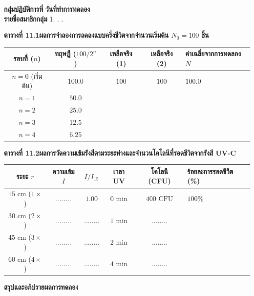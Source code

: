 \begin{worksheetbox}
\textbf{กลุ่มปฏิบัติการที่} \dotfill \textbf{วันที่ทำการทดลอง} \dotfill\\[4pt]
\textbf{รายชื่อสมาชิกกลุ่ม} 1. . . \dotfill

\vspace{4pt}
\textbf{ตารางที่ 11.1\quad ผลการจำลองการลดลงแบบครึ่งชีวิตจากจำนวนเริ่มต้น $N_0 = 100$ ชิ้น}
\begin{center}
\footnotesize\setlength{\tabcolsep}{3.5pt}
\begin{tabularx}{\linewidth}{c c c c >{\raggedright\arraybackslash}X}
\toprule
\textbf{รอบที่ ($n$)} & \textbf{ทฤษฎี ($100/2^n$)} & \textbf{เหลือจริง (1)} & \textbf{เหลือจริง (2)} & \textbf{ค่าเฉลี่ยจากการทดลอง $\bar{N}$} \\
\midrule
$n = 0$ (เริ่มต้น) & $100.0$ & $100$ & $100$ & $100.0$ \\[4pt]
$n = 1$ & $50.0$ & \dotfill & \dotfill & \dotfill \\[4pt]
$n = 2$ & $25.0$ & \dotfill & \dotfill & \dotfill \\[4pt]
$n = 3$ & $12.5$ & \dotfill & \dotfill & \dotfill \\[4pt]
$n = 4$ & $6.25$ & \dotfill & \dotfill & \dotfill \\
\bottomrule
\end{tabularx}
\end{center}

\vspace{4pt}
\textbf{ตารางที่ 11.2\quad ผลการวัดความเข้มรังสีตามระยะห่างและจำนวนโคโลนีที่รอดชีวิตจากรังสี UV-C}
\begin{center}
\footnotesize\setlength{\tabcolsep}{3.5pt}
\begin{tabularx}{\linewidth}{c c c | c c >{\raggedright\arraybackslash}X}
\toprule
\textbf{ระยะ $r$} & \textbf{ความเข้ม $I$} & \textbf{$I/I_{15}$} & \textbf{เวลา UV} & \textbf{โคโลนี (CFU)} & \textbf{ร้อยละการรอดชีวิต (\%)} \\
\midrule
$15\text{ cm}$ ($1\times$) & ........ & $1.00$ & $0\text{ min}$ & $400\text{ CFU}$ & $100\%$ \\[6pt]
$30\text{ cm}$ ($2\times$) & ........ & ........ & $1\text{ min}$ & ........ & \dotfill \\[6pt]
$45\text{ cm}$ ($3\times$) & ........ & ........ & $2\text{ min}$ & ........ & \dotfill \\[6pt]
$60\text{ cm}$ ($4\times$) & ........ & ........ & $4\text{ min}$ & ........ & \dotfill \\
\bottomrule
\end{tabularx}
\end{center}

\vspace{4pt}
\textbf{สรุปและอภิปรายผลการทดลอง}\\[4pt]
\dotfill\\[6pt]
\dotfill
\end{worksheetbox}

